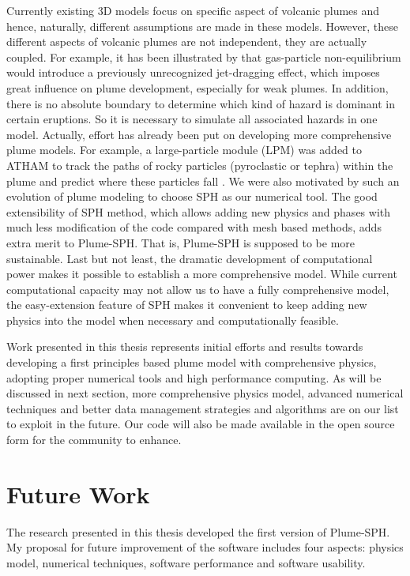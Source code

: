Currently existing 3D models focus on specific aspect of  volcanic plumes and hence, naturally, different assumptions are made in these models. However, these different aspects of volcanic plumes are not independent, they are actually coupled. For example, it has been illustrated by \cite{cerminara2016large} that gas-particle non-equilibrium would introduce a previously unrecognized jet-dragging effect, which imposes great influence on plume development, especially for weak plumes. In addition, there is no absolute boundary to determine which kind of hazard is dominant in certain eruptions. So it is necessary to simulate all associated hazards in one model. Actually, effort has already been put on developing more comprehensive plume models. For example, a large-particle module (LPM) was added to ATHAM to track the paths of rocky particles (pyroclastic or tephra) within the plume and predict where these particles fall \citep{kobs2009modeling}. We were also motivated by such an evolution of plume modeling to choose SPH as our numerical tool. The good extensibility of SPH method, which allows adding new physics and phases with much less modification of the code compared with mesh based methods, adds extra merit to Plume-SPH. That is, Plume-SPH is supposed to be more sustainable.
Last but not least, the dramatic development of computational power makes it possible to establish a more comprehensive model. While current computational capacity may not allow us to have a fully comprehensive model, the easy-extension feature of SPH makes it convenient to keep adding new physics into the model when necessary and computationally feasible. 

Work presented in this thesis represents initial efforts and results towards developing a first principles based plume model with comprehensive physics, adopting proper numerical tools and high performance computing. As will be discussed in next section, more comprehensive physics model, advanced numerical techniques and better data management strategies and algorithms are on our list to exploit in the future. Our code will also be made available in the open source form for the community to enhance.

\section{Future Work}
The research presented in this thesis developed the first version of Plume-SPH.
My proposal for future improvement of the software includes four aspects: physics model, numerical techniques, software performance and software usability.

